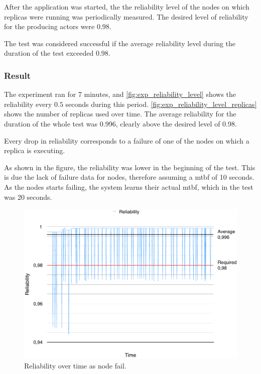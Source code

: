 \documentclass{cslthse-msc}
\begin{document}
After the application was started, the the reliability level of the nodes on which replicas were running was periodically measured. The desired level of reliability for the producing actors were 0.98.

The test was considered successful if the average reliability level during the duration of the test exceeded 0.98.

\subsubsection*{Result}
The experiment ran for 7 minutes, and \autoref{fig:exp_reliability_level} shows the reliability every $0.5$ seconds during this period. \autoref{fig:exp_reliability_level_replicas} shows the number of replicas used over time. The average reliability for the duration of the whole test was 0.996, clearly above the desired level of 0.98.

Every drop in reliability corresponds to a failure of one of the nodes on which a replica is executing.

As shown in the figure, the reliability was lower in the beginning of the test. This is due the lack of failure data for nodes, therefore assuming a mtbf of 10 seconds. As the nodes starts failing, the system learns their actual mtbf, which in the test was 20 seconds.

\begin{figure}[!hbt]
\centering
\includegraphics[scale=0.5]{images/results/reliability.pdf}
\caption{Reliability over time as node fail.} \label{fig:exp_reliability_level}
\end{figure}
\end{document}
